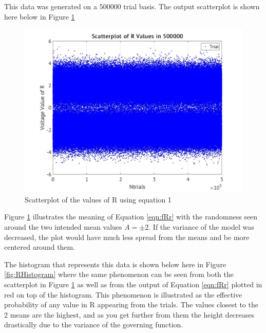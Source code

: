 \documentclass[a4paper, 11pt]{article}
\begin{document}
\bigskip
\noindent
This data was generated on a 500000 trial basis. The output scatterplot is shown here below in Figure \ref{fig:RScatterplot}

\begin{figure}[htbp]
\centering
\includegraphics[width=.9\linewidth]{./Images/ScatterplotR1.jpg}
\caption{\label{fig:RScatterplot}Scatterplot of the values of R using equation 1}
\end{figure}


\noindent
Figure \ref{fig:RScatterplot} illustrates the meaning of Equation \ref{eqn:fRr} with the randomness seen around the two intended mean values \(A = \pm2\).
If the variance of the model was decreased, the plot would have much less spread from the means and be more centered around them.

\bigskip
\noindent
The histogram that represents this data is shown below here in Figure \ref{fig:RHistogram}
where the same phenomenon can be seen from both the scatterplot in Figure \ref{fig:RScatterplot} as well as from the output of Equation \ref{eqn:fRr} plotted in red on top of the histogram.
This phenomenon is illustrated as the effective probability of any value in R appearing from the trials. The values closest to the 2 means are the highest, and as you get further from them
the height decreases drastically due to the variance of the governing function.
\end{document}

